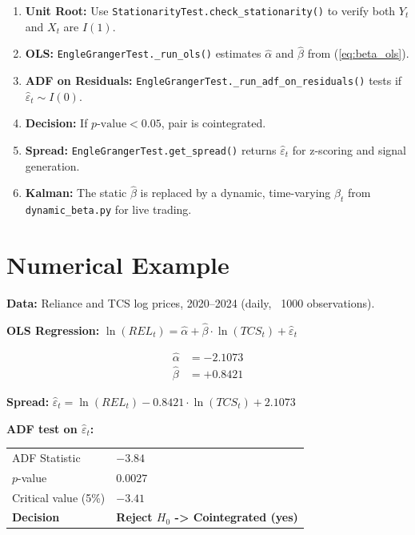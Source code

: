 \documentclass[12pt, a4paper]{article}
\begin{document}
\begin{enumerate}[label=\textbf{Step \arabic*:}]
    \item \textbf{Unit Root:} Use \texttt{StationarityTest.check\_stationarity()} to verify 
          both $Y_t$ and $X_t$ are $I(1)$.
    \item \textbf{OLS:} \texttt{EngleGrangerTest.\_run\_ols()} estimates $\hat\alpha$ and 
          $\hat\beta$ from (\ref{eq:beta_ols}).
    \item \textbf{ADF on Residuals:} \texttt{EngleGrangerTest.\_run\_adf\_on\_residuals()} 
          tests if $\hat\varepsilon_t \sim I(0)$.
    \item \textbf{Decision:} If $p\text{-value} < 0.05$, pair is cointegrated.
    \item \textbf{Spread:} \texttt{EngleGrangerTest.get\_spread()} returns $\hat\varepsilon_t$ 
          for z-scoring and signal generation.
    \item \textbf{Kalman:} The static $\hat\beta$ is replaced by a dynamic, time-varying 
          $\beta_t$ from \texttt{dynamic\_beta.py} for live trading.
\end{enumerate}

\section{Numerical Example}

\textbf{Data:} Reliance and TCS log prices, 2020--2024 (daily, ~1000 observations).

\medskip
\textbf{OLS Regression: } $\ln(REL_t) = \hat\alpha + \hat\beta \cdot \ln(TCS_t) + \hat\varepsilon_t$

\begin{align*}
    \hat\alpha &= -2.1073 \\
    \hat\beta  &= +0.8421
\end{align*}

\textbf{Spread:} $\hat\varepsilon_t = \ln(REL_t) - 0.8421 \cdot \ln(TCS_t) + 2.1073$

\medskip
\textbf{ADF test on $\hat\varepsilon_t$:}

\begin{center}
\begin{tabular}{@{}ll@{}}
\toprule
ADF Statistic       & $-3.84$ \\
$p$-value            & $0.0027$ \\
Critical value (5\%) & $-3.41$ \\
\midrule
\textbf{Decision}    & \textbf{Reject $H_0$ -> Cointegrated (yes)} \\
\bottomrule
\end{tabular}
\end{center}
\end{document}
